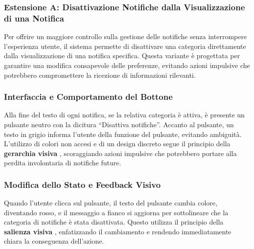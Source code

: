 \clearpage
\newpage

\subsubsection{Estensione A: Disattivazione Notifiche dalla Visualizzazione di una Notifica}

Per offrire un maggiore controllo sulla gestione delle notifiche senza interrompere l’esperienza utente, il sistema permette di disattivare una categoria direttamente dalla visualizzazione di una notifica specifica. Questa variante è progettata per garantire una modifica consapevole delle preferenze, evitando azioni impulsive che potrebbero compromettere la ricezione di informazioni rilevanti.

\vspace{0.5cm}
\subsubsection{Interfaccia e Comportamento del Bottone}
Alla fine del testo di ogni notifica, se la relativa categoria è attiva, è presente un pulsante neutro con la dicitura “Disattiva notifiche”. Accanto al pulsante, un testo in grigio informa l’utente della funzione del pulsante, evitando ambiguità. L’utilizzo di colori non accesi e di un design discreto segue il principio della \textbf{gerarchia visiva} \cite{pieters2004}, scoraggiando azioni impulsive che potrebbero portare alla perdita involontaria di notifiche future.

\vspace{0.5cm}
\subsubsection{Modifica dello Stato e Feedback Visivo}
Quando l’utente clicca sul pulsante, il testo del pulsante cambia colore, diventando rosso, e il messaggio a fianco si aggiorna per sottolineare che la categoria di notifiche è stata disattivata. Questo utilizza il principio della \textbf{salienza visiva} \cite{nielsen1995}, enfatizzando il cambiamento e rendendo immediatamente chiara la conseguenza dell’azione.

\vspace{0.5cm}
